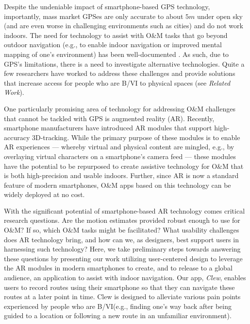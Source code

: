 \documentclass[chi_draft]{sigchi}
\newcommand{\BVI}{B/VI\xspace}
\newcommand{\OM}{O\&M\xspace}
\begin{document}
Despite the undeniable impact of smartphone-based GPS technology, importantly, mass market GPSes are only accurate to about $5m$ under open sky (and are even worse in challenging environments such as cities) and do not work indoors.  The need for technology to assist with \OM tasks that go beyond outdoor navigation (e.g., to enable indoor navigation or improved mental mapping of one's environment) has been well-documented \cite{long1997establishing}.  As such, due to GPS's limitations, there is a need to investigate alternative technologies.  Quite a few researchers have worked to address these challenges and provide solutions that increase access for people who are \BVI to physical spaces (see \emph{Related Work}).

One particularly promising area of technology for addressing \OM challenges that cannot be tackled with GPS is augmented reality (AR).  Recently, smartphone manufacturers have introduced AR modules that support high-accuracy 3D-tracking.  While the primary purpose of these modules is to enable AR experiences --- whereby virtual and physical content are mingled, e.g., by overlaying virtual characters on a smartphone's camera feed --- these modules have the potential to be repurposed to create assistive technology for \OM that is both high-precision and usable indoors.  Further, since AR is now a standard feature of modern smartphones, \OM apps based on this technology can be widely deployed at no cost.

With the significant potential of smartphone-based AR technology comes critical research questions.  Are the motion estimates provided robust enough to use for \OM? If so, which \OM tasks might be facilitated?  What usability challenges does AR technology bring, and how can we, as designers, best support users in harnessing such technology?  Here, we take preliminary steps towards answering these questions by presenting our work utilizing user-centered design to leverage the AR modules in modern smartphones to create, and to release to a global audience, an application to assist with indoor navigation.  Our app, \emph{Clew}, enables users to record routes using their smartphone so that they can navigate these routes at a later point in time.  Clew is designed to alleviate various pain points experienced by people who are \BVI (e.g., finding one's way back after being guided to a location or following a new route in an unfamiliar environment).%
\end{document}
